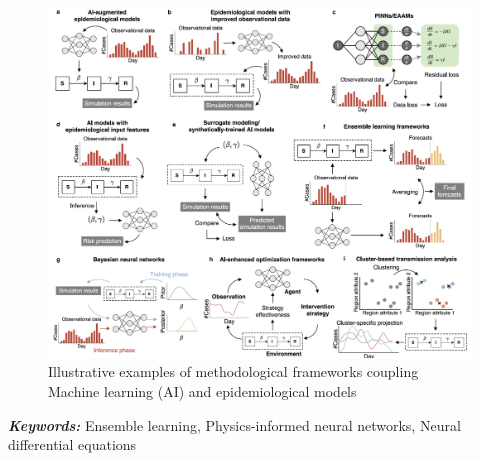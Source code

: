\begin{figure}
  \includegraphics[width=\linewidth]{figures/chap1/chap1-hybrid.png}
  \caption{Illustrative examples of methodological frameworks coupling Machine learning (AI) and epidemiological models}
  \label{fig:chap1-hybrid}
\end{figure}



\textit{\textbf{Keywords:}} Ensemble learning, Physics-informed neural networks, Neural differential equations




